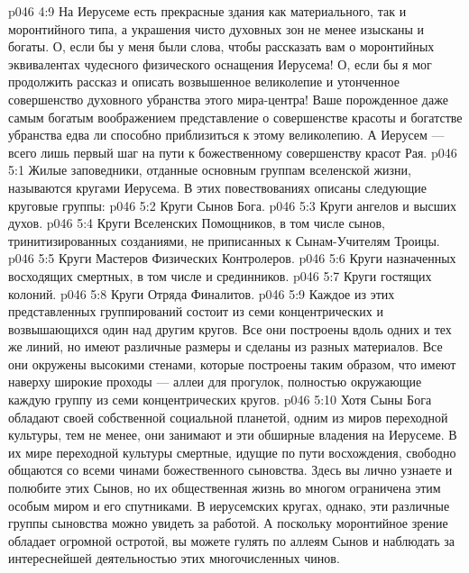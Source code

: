 \vs p046 4:9 На Иерусеме есть прекрасные здания как материального, так и моронтийного типа, а украшения чисто духовных зон не менее изысканы и богаты. О, если бы у меня были слова, чтобы рассказать вам о моронтийных эквивалентах чудесного физического оснащения Иерусема! О, если бы я мог продолжить рассказ и описать возвышенное великолепие и утонченное совершенство духовного убранства этого мира\hyp{}центра! Ваше порожденное даже самым богатым воображением представление о совершенстве красоты и богатстве убранства едва ли способно приблизиться к этому великолепию. А Иерусем --- всего лишь первый шаг на пути к божественному совершенству красот Рая.
\vs p046 5:1 Жилые заповедники, отданные основным группам вселенской жизни, называются кругами Иерусема. В этих повествованиях описаны следующие круговые группы:
\vs p046 5:2 \bibnobreakspace Круги Сынов Бога.
\vs p046 5:3 \bibnobreakspace Круги ангелов и высших духов.
\vs p046 5:4 \bibnobreakspace Круги Вселенских Помощников, в том числе сынов, тринитизированных созданиями, не приписанных к Сынам\hyp{}Учителям Троицы.
\vs p046 5:5 \bibnobreakspace Круги Мастеров Физических Контролеров.
\vs p046 5:6 \bibnobreakspace Круги назначенных восходящих смертных, в том числе и срединников.
\vs p046 5:7 \bibnobreakspace Круги гостящих колоний.
\vs p046 5:8 \bibnobreakspace Круги Отряда Финалитов.
\vs p046 5:9 \pc Каждое из этих представленных группирований состоит из семи концентрических и возвышающихся один над другим кругов. Все они построены вдоль одних и тех же линий, но имеют различные размеры и сделаны из разных материалов. Все они окружены высокими стенами, которые построены таким образом, что имеют наверху широкие проходы --- аллеи для прогулок, полностью окружающие каждую группу из семи концентрических кругов.
\vs p046 5:10 \pc {}\bibnobreakspace {} Хотя Сыны Бога обладают своей собственной социальной планетой, одним из миров переходной культуры, тем не менее, они занимают и эти обширные владения на Иерусеме. В их мире переходной культуры смертные, идущие по пути восхождения, свободно общаются со всеми чинами божественного сыновства. Здесь вы лично узнаете и полюбите этих Сынов, но их общественная жизнь во многом ограничена этим особым миром и его спутниками. В иерусемских кругах, однако, эти различные группы сыновства можно увидеть за работой. А поскольку моронтийное зрение обладает огромной остротой, вы можете гулять по аллеям Сынов и наблюдать за интереснейшей деятельностью этих многочисленных чинов.
